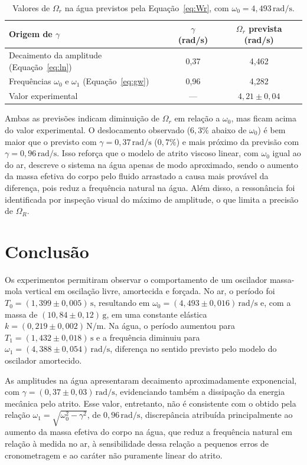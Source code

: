 \documentclass[12pt, a4paper]{article}
\newcommand{\un}[1]{\,\mathrm{#1}}
\newcommand{\fonte}[1]{\par\vspace{2pt}{\footnotesize Fonte: #1}}
\begin{document}
\begin{table}[H]
\centering
\caption{Valores de $\Omega_r$ na água previstos pela Equação~\eqref{eq:Wr}, com $\omega_0=4{,}493\un{rad/s}$.}
\label{tab:comparacao}
\begin{tabular}{lcc}
\toprule
Origem de $\gamma$ & $\gamma$ (rad/s) & $\Omega_r$ prevista (rad/s) \\
\midrule
Decaimento da amplitude (Equação~\ref{eq:ln}) & 0,37 & 4,462 \\
Frequências $\omega_0$ e $\omega_1$ (Equação~\ref{eq:gw}) & 0,96 & 4,282 \\
\midrule
Valor experimental & --- & $4{,}21\pm0{,}04$ \\
\bottomrule
\end{tabular}
\fonte{Elaborada pelos autores.}
\end{table}

Ambas as previsões indicam diminuição de $\Omega_r$ em relação a $\omega_0$, mas ficam acima do valor experimental. O deslocamento observado ($6{,}3\%$ abaixo de $\omega_0$) é bem maior que o previsto com $\gamma=0{,}37\un{rad/s}$ ($0{,}7\%$) e mais próximo da previsão com $\gamma=0{,}96\un{rad/s}$. Isso reforça que o modelo de atrito viscoso linear, com $\omega_0$ igual ao do ar, descreve o sistema na água apenas de modo aproximado, sendo o aumento da massa efetiva do corpo pelo fluido arrastado a causa mais provável da diferença, pois reduz a frequência natural na água. Além disso, a ressonância foi identificada por inspeção visual do máximo de amplitude, o que limita a precisão de $\Omega_R$.

\section{Conclusão}

Os experimentos permitiram observar o comportamento de um oscilador massa-mola vertical em oscilação livre, amortecida e forçada. No ar, o período foi $T_0=(1{,}399\pm0{,}005)\un{s}$, resultando em $\omega_0=(4{,}493\pm0{,}016)\un{rad/s}$ e, com a massa de $(10{,}84\pm0{,}12)\un{g}$, em uma constante elástica $k=(0{,}219\pm0{,}002)\un{N/m}$. Na água, o período aumentou para $T_1=(1{,}432\pm0{,}018)\un{s}$ e a frequência diminuiu para $\omega_1=(4{,}388\pm0{,}054)\un{rad/s}$, diferença no sentido previsto pelo modelo do oscilador amortecido.

As amplitudes na água apresentaram decaimento aproximadamente exponencial, com $\gamma=(0{,}37\pm0{,}03)\un{rad/s}$, evidenciando também a dissipação da energia mecânica pelo atrito. Esse valor, entretanto, não é consistente com o obtido pela relação $\omega_1=\sqrt{\omega_0^2-\gamma^2}$, de $0{,}96\un{rad/s}$, discrepância atribuída principalmente ao aumento da massa efetiva do corpo na água, que reduz a frequência natural em relação à medida no ar, à sensibilidade dessa relação a pequenos erros de cronometragem e ao caráter não puramente linear do atrito.
\end{document}
